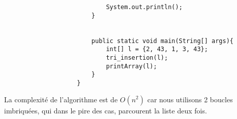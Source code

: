 \begin{Exercice} [10 minutes]
\begin{itemize}
\begin{verbatim}
                            System.out.println(); 
                        } 
              
                        
                        public static void main(String[] args){
                            int[] l = {2, 43, 1, 3, 43};
                            tri_insertion(l);
                            printArray(l);
                        }
                    }
                \end{verbatim}
    \end{itemize}
    
    La complexité de l'algorithme est de $O(n^2)$ car nous utilisons 2 boucles imbriquées, qui dans le pire des cas, parcourent la liste deux fois.
    
\end{Exercice}

